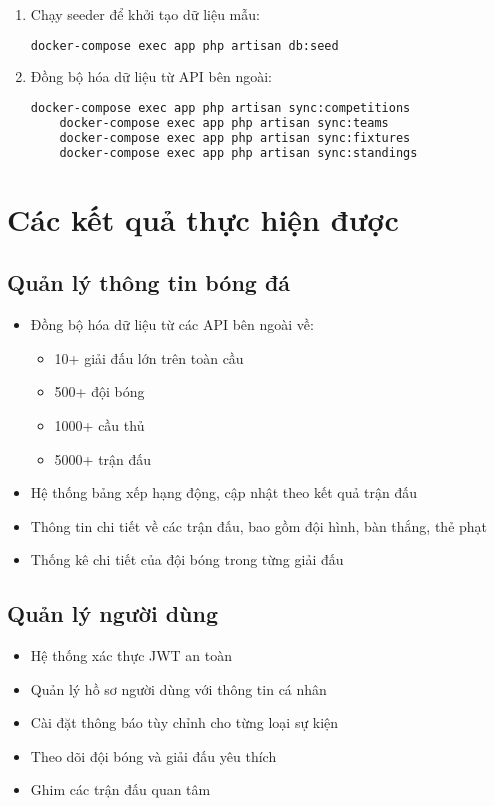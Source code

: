 \documentclass[a4paper,12pt]{report}
\begin{document}
\begin{enumerate}
    \item Chạy seeder để khởi tạo dữ liệu mẫu:
    \begin{lstlisting}[language=bash]
    docker-compose exec app php artisan db:seed
    \end{lstlisting}

    \item Đồng bộ hóa dữ liệu từ API bên ngoài:
    \begin{lstlisting}[language=bash]
    docker-compose exec app php artisan sync:competitions
    docker-compose exec app php artisan sync:teams
    docker-compose exec app php artisan sync:fixtures
    docker-compose exec app php artisan sync:standings
    \end{lstlisting}
\end{enumerate}

\section{Các kết quả thực hiện được}

\subsection{Quản lý thông tin bóng đá}

\begin{itemize}
    \item Đồng bộ hóa dữ liệu từ các API bên ngoài về:
    \begin{itemize}
        \item 10+ giải đấu lớn trên toàn cầu
        \item 500+ đội bóng
        \item 1000+ cầu thủ
        \item 5000+ trận đấu
    \end{itemize}
    \item Hệ thống bảng xếp hạng động, cập nhật theo kết quả trận đấu
    \item Thông tin chi tiết về các trận đấu, bao gồm đội hình, bàn thắng, thẻ phạt
    \item Thống kê chi tiết của đội bóng trong từng giải đấu
\end{itemize}

\subsection{Quản lý người dùng}

\begin{itemize}
    \item Hệ thống xác thực JWT an toàn
    \item Quản lý hồ sơ người dùng với thông tin cá nhân
    \item Cài đặt thông báo tùy chỉnh cho từng loại sự kiện
    \item Theo dõi đội bóng và giải đấu yêu thích
    \item Ghim các trận đấu quan tâm
\end{itemize}
\end{document}
